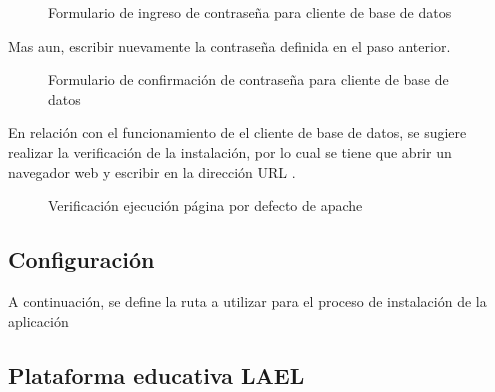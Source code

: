 \begin{figure}[H]
\centering
		\caption{Formulario de ingreso de contraseña para cliente de base de datos}
\end{figure}

Mas aun, escribir nuevamente la contraseña definida en el paso anterior.

\begin{figure}[!ht]
\centering
		\caption{Formulario de confirmación de contraseña para cliente de base de datos}
\end{figure}

En relación con el funcionamiento de el cliente de base de datos, se sugiere
realizar la verificación de la instalación, por lo cual se tiene que abrir un
navegador web y escribir en la dirección URL 
.

\begin{figure}[!ht]
\centering
		\caption{Verificación ejecución página por defecto de apache}
\end{figure}

\subsection{Configuración}

A continuación, se define la ruta a utilizar para el proceso de instalación de
la aplicación 

\subsection{Plataforma educativa LAEL}

